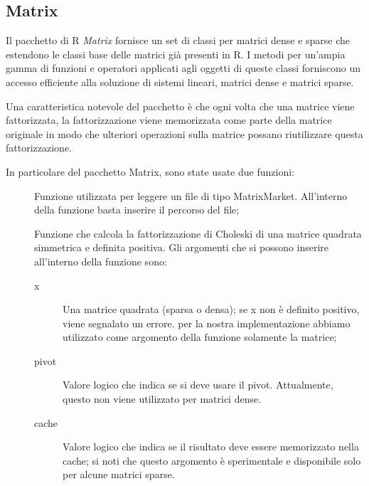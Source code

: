 \subsection{Matrix}
Il pacchetto di R \textit{Matrix} fornisce un set di classi per matrici dense e sparse che estendono le classi base delle matrici già presenti in R. I metodi per un'ampia gamma di funzioni e operatori applicati agli oggetti di queste classi forniscono un accesso efficiente alla soluzione di sistemi lineari, matrici dense e matrici sparse.

Una caratteristica notevole del pacchetto è che ogni volta che una matrice viene fattorizzata, la fattorizzazione viene memorizzata come parte della matrice originale in modo che ulteriori operazioni sulla matrice possano riutilizzare questa fattorizzazione.

In particolare del pacchetto Matrix, sono state usate due funzioni:

\begin{description}
\item[\verb!readMM()] Funzione utilizzata per leggere un file di tipo MatrixMarket. All'interno della funzione basta inserire il percorso del file;
\item[\verb!chol()] Funzione che calcola la fattorizzazione di Choleski di una matrice quadrata simmetrica e definita positiva. Gli argomenti che si possono inserire all'interno della funzione sono:
\begin{description}
\item[x] Una matrice quadrata (sparsa o densa); se x non è definito positivo, viene segnalato un errore. per la nostra implementazione abbiamo utilizzato come argomento della funzione solamente la matrice;

\item[pivot] Valore logico che indica se si deve usare il pivot. Attualmente, questo non viene utilizzato per matrici dense.

\item[cache] Valore logico che indica se il risultato deve essere memorizzato nella cache; si noti che questo argomento è sperimentale e disponibile solo per alcune matrici sparse.
\end{description}
\end{description}

